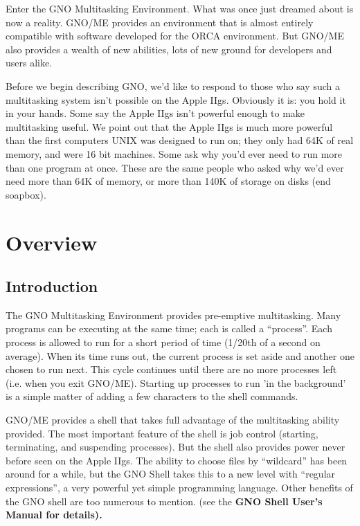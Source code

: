 \documentclass{report}
\begin{document}
Enter the GNO Multitasking Environment.
What was once just dreamed about is now a reality. GNO/ME
provides an environment that is almost entirely compatible with
software developed for the ORCA environment. But GNO/ME also
provides a wealth of new abilities, lots of new ground for
developers and users alike.

Before we begin describing GNO, we'd like to
respond to those who say such a multitasking system isn't
possible on the Apple IIgs. Obviously it is: you hold it in your
hands. Some say the Apple IIgs isn't powerful enough to make
multitasking useful. We point out that the Apple IIgs is much
more powerful than the first computers UNIX was designed to run
on; they only had 64K of real memory, and were 16 bit machines.
Some ask why you'd ever need to run more than one program at
once. These are the same people who asked why we'd ever need more
than 64K of memory, or more than 140K of storage on disks (end
soapbox).

\chapter{Overview}

\section{Introduction}

The GNO Multitasking Environment provides
pre-emptive multitasking. Many programs can be executing at the
same time; each is called a ``process''. Each process is allowed to
run for a short period of time (1/20th of a second on average).
When its time runs out, the current process is set aside and
another one chosen to run next. This cycle continues until there
are no more processes left (i.e. when you exit GNO/ME). Starting
up processes to run 'in the background' is a simple matter of
adding a few characters to the shell commands.

GNO/ME provides a shell that takes full
advantage of the multitasking ability provided. The most
important feature of the shell is job control (starting,
terminating, and suspending processes). But the shell also
provides power never before seen on the Apple IIgs. The ability
to choose files by ``wildcard'' has been around for a while, but
the GNO Shell takes this to a new level with ``regular
expressions'', a very powerful yet simple programming language.
Other benefits of the GNO shell are too numerous to mention. (see
the \bf GNO Shell User's Manual \rm for details).
\end{document}
